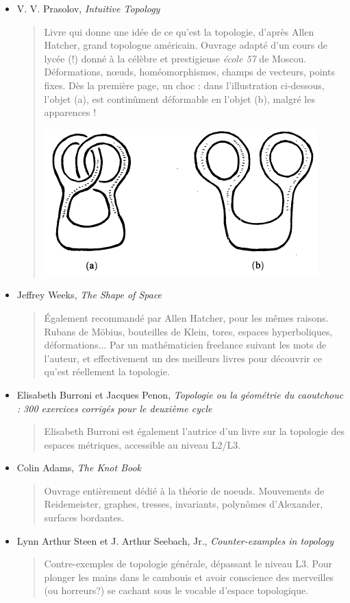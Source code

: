 \documentclass{article}
\begin{document}
\newpage
\begin{itemize}
\item V. V. Prasolov, \emph{Intuitive Topology}
\begin{quote}
Livre qui \og donne une idée de ce qu'est la topologie\fg, d'après Allen Hatcher, grand topologue américain.  Ouvrage adapté d'un cours de lycée (!) donné à la célèbre et prestigieuse  \emph{école 57} de Moscou. Déformations, n\oe uds, homéomorphismes, champs de vecteurs, points fixes. Dès la première page, un choc : dans l'illustration ci-dessous, l'objet (a), est continûment déformable en l'objet (b), malgré les apparences !
\begin{center}
\includegraphics[scale=.6]{enlacement}
\end{center}
\end{quote}
\item Jeffrey Weeks, \emph{The Shape of Space}
\begin{quote}
Également recommandé par Allen Hatcher, pour les mêmes raisons. Rubans de Möbius, bouteilles de Klein, tores, espaces hyperboliques, déformations... Par un \og mathématicien freelance\fg{} suivant les mots de l'auteur, et effectivement un des meilleurs livres pour découvrir ce qu'est réellement la topologie.
\end{quote}
\item  Elisabeth Burroni et Jacques Penon, \emph{Topologie ou la géométrie du caoutchouc : 300 exercices corrigés pour le deuxième cycle}
\begin{quote}
Elisabeth Burroni est également l'autrice d'un livre sur la topologie des espaces métriques, accessible au niveau L2/L3.
\end{quote}
\item Colin Adams, \emph{The Knot Book}
\begin{quote}
Ouvrage entièrement dédié à la théorie de noeuds. Mouvements de Reidemeister, graphes, tresses, invariants, polynômes d'Alexander, surfaces bordantes.
\end{quote}
\item Lynn Arthur Steen et J. Arthur Seebach, Jr., \emph{Counter-examples in topology}
\begin{quote}
Contre-exemples de topologie générale, dépassant le niveau L3. Pour plonger les mains dans le cambouis et avoir conscience des  merveilles (ou horreurs?) se cachant sous le vocable d'\og espace topologique\fg.
\end{quote}
\end{itemize}
\end{document}
